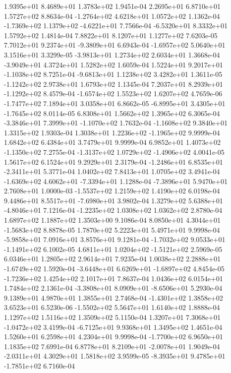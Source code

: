 1.9395e+01 8.4689e+01 1.3783e+02  1.9451e-04
2.2695e+01 6.8710e+01 1.5727e+02  8.8634e-04
-1.2764e+02  4.6218e+01  1.0572e+02  1.1362e-04
-1.7369e+02  1.1379e+02 -4.6221e+01  7.7566e-04
-6.5320e+01  8.3332e+01  1.5792e+02  1.4814e-04
7.8822e+01 8.1207e+01 1.1277e+02  7.6203e-05
 7.7012e+01  9.2374e+01 -9.3809e+01  6.6943e-04
-1.6957e+02  5.0640e+01  3.1516e+01  3.3299e-05
-3.9813e+01  1.2734e+02  2.6034e+01  1.3668e-04
-3.9049e+01  4.3724e+01  1.5282e+02  1.6059e-04
 1.5224e+01  9.2017e+01 -1.1038e+02  8.7251e-04
-9.6813e+01  1.1238e+02  3.4282e+01  1.3611e-05
-1.1242e+02  2.9738e+01  1.6793e+02  1.1345e-04
 7.2037e+01  8.2939e+01 -1.1292e+02  8.4579e-04
-1.6574e+02  1.5523e+02  1.6207e+02  4.7659e-06
-1.7477e+02  7.1894e+01  3.0358e+01  6.8662e-05
-6.8995e+01  3.4305e+01 -1.7645e+02  8.0114e-05
6.8308e+01 1.5662e+02 1.3965e+02  6.3065e-04
-3.3846e+01  7.3999e+01 -1.1070e+02  1.7632e-04
-1.1608e+02  9.3840e+01  1.3315e+02  1.9303e-04
 1.3038e+01  1.2236e+02 -1.1965e+02  9.9999e-04
1.6842e+02 6.4384e+01 3.7479e+01  9.9999e-04
 6.9852e+01  1.4073e+02 -1.1350e+02  7.2755e-04
-1.3137e+02  1.0729e+02 -1.4906e+02  4.0041e-05
1.5617e+02 6.1524e+01 9.2929e+01  2.3179e-04
-1.2486e+01  6.8535e+01 -2.3411e+01  5.3771e-04
1.0402e+02 7.8413e+01 1.0705e+02  3.4941e-04
-1.6369e+02  4.6062e+01 -7.3394e+01  1.1288e-04
-7.3896e+01  5.9470e+01  2.7608e+01  1.0000e-03
-1.5537e+02  1.2159e+02  1.4190e+02  6.0198e-04
 9.4486e+01  8.5517e+01 -7.6980e+01  3.9802e-04
 1.3279e+02  5.6388e+01 -4.8046e+01  7.1216e-04
-1.2235e+02  1.0308e+02  1.0362e+02  2.8780e-04
1.6897e+02 1.1887e+02 1.3503e+00  9.1086e-04
 8.0850e+01  4.3044e+01 -1.5683e+02  8.8878e-05
1.7870e+02 5.2223e+01 5.4971e+01  9.9998e-04
-5.9858e+01  7.0916e+01  3.8576e+01  9.1281e-04
-1.7032e+02  9.0533e+01 -1.1491e+02  6.1002e-05
 4.6811e+01  1.0204e+02 -1.5121e+02  2.5969e-05
6.0346e+01 1.2805e+02 2.9614e+01  7.9235e-04
 1.0038e+02  2.2888e+01 -1.6749e+02  1.5920e-04
-3.6448e+01  6.6269e+01 -1.6897e+02  4.8454e-05
-1.7236e+02  1.4254e+02  2.1017e+01  7.8637e-04
1.0436e+02 6.0154e+01 1.7484e+02  2.1361e-04
-3.3808e+01  8.0909e+01 -8.6506e+01  5.2930e-04
9.1389e+01 4.9870e+01 1.3855e+01  2.7468e-04
-1.4301e+02  1.3858e+02  3.6523e+01  6.5230e-06
-1.5502e+02  5.5647e+01  1.6140e+02  1.8888e-04
1.1297e+02 1.5116e+02 1.3509e+02  5.1150e-04
 1.3207e+01  7.3068e+01 -1.0472e+02  3.4199e-04
-6.7125e+01  9.9368e+01  1.3495e+02  1.4651e-04
1.5260e+01 6.2598e+01 4.2304e+01  9.9998e-04
-1.7700e+02  6.9650e+01  1.1835e+02  7.6991e-04
 6.8778e+01  8.2109e+01 -2.0078e+01  1.9049e-04
-2.0311e+01  4.3029e+01  1.5818e+02  3.9599e-05
-8.3935e+01  9.4785e+01 -1.7851e+02  6.7160e-04
